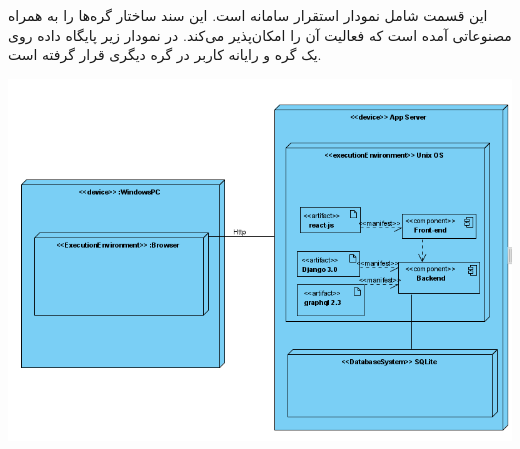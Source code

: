 
این قسمت شامل نمودار استقرار سامانه است. این سند ساختار گره‌ها را به همراه مصنوعاتی آمده است که فعالیت آن را امکان‌پذیر می‌کند. در نمودار زیر پایگاه داده روی یک گره و رایانه کاربر در گره دیگری قرار گرفته است.



\centering
\includegraphics[width = 0.8 \linewidth]{../figs/deploymentdiagram.png}

